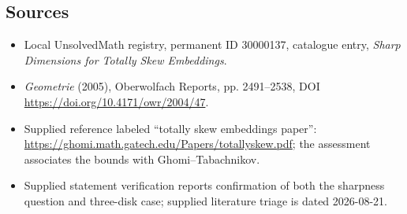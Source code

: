 \documentclass[11pt]{article}
\begin{document}
\subsection{Sources}
\begin{itemize}
\item Local UnsolvedMath registry, permanent ID 30000137, catalogue entry, \emph{Sharp Dimensions for Totally Skew Embeddings}.
\item \emph{Geometrie} (2005), Oberwolfach Reports, pp. 2491--2538, DOI \url{https://doi.org/10.4171/owr/2004/47}.
\item Supplied reference labeled ``totally skew embeddings paper'': \url{https://ghomi.math.gatech.edu/Papers/totallyskew.pdf}; the assessment associates the bounds with Ghomi--Tabachnikov.
\item Supplied statement verification reports confirmation of both the sharpness question and three-disk case; supplied literature triage is dated 2026-08-21.
\end{itemize}
\end{document}
